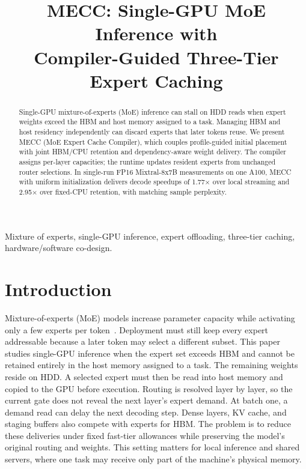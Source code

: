 \documentclass[conference,9pt,letterpaper]{IEEEtran}
\title{MECC: Single-GPU MoE Inference with\protect\\Compiler-Guided Three-Tier Expert Caching}
\author{}
\begin{document}
\maketitle\raggedbottom
\begin{abstract}
Single-GPU mixture-of-experts (MoE) inference can stall on HDD reads when expert weights exceed the HBM and host memory assigned to a task. Managing HBM and host residency independently can discard experts that later tokens reuse. We present MECC (MoE Expert Cache Compiler), which couples profile-guided initial placement with joint HBM/CPU retention and dependency-aware weight delivery. The compiler assigns per-layer capacities; the runtime updates resident experts from unchanged router selections. In single-run FP16 Mixtral-8x7B measurements on one A100, MECC with uniform initialization delivers decode speedups of 1.77$\times$ over local streaming and 2.95$\times$ over fixed-CPU retention, with matching sample perplexity.
\end{abstract}

\begin{IEEEkeywords}
Mixture of experts, single-GPU inference, expert offloading, three-tier caching, hardware/software co-design.
\end{IEEEkeywords}

\section{Introduction}
Mixture-of-experts (MoE) models increase parameter capacity while activating only a few experts per token~\cite{shazeer,switch,mixtral,deepseekmoe}. Deployment must still keep every expert addressable because a later token may select a different subset. This paper studies single-GPU inference when the expert set exceeds HBM and cannot be retained entirely in the host memory assigned to a task. The remaining weights reside on HDD. A selected expert must then be read into host memory and copied to the GPU before execution. Routing is resolved layer by layer, so the current gate does not reveal the next layer's expert demand. At batch one, a demand read can delay the next decoding step. Dense layers, KV cache, and staging buffers also compete with experts for HBM. The problem is to reduce these deliveries under fixed fast-tier allowances while preserving the model's original routing and weights. This setting matters for local inference and shared servers, where one task may receive only part of the machine's physical memory.
\end{document}
